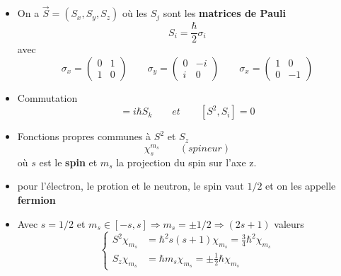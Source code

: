\begin{itemize}
	\item On a $\vec{S} = (S_x,S_y,S_z)$ où les $S_j$ sont les \textbf{matrices de Pauli} 
		\begin{equation}
			S_i = \frac{\hbar}{2}\sigma _i
		\end{equation}
		avec
		\begin{equation}
			\sigma _x = 
			\left(
			\begin{array}{cc}
			0 & 1 \\ 
			1 & 0
			\end{array}
			\right)
			\qquad
			\sigma _y = 
			\left(
			\begin{array}{cc}
			0 & -i \\ 
			i & 0
			\end{array}
			\right)
			\qquad
			\sigma _x = 
			\left(
			\begin{array}{cc}
			1 & 0 \\ 
			0 & -1
			\end{array}
			\right) 
		\end{equation}
	
	\item Commutation
		\begin{equation}
			[S_i,S_j] = i\hbar S_k \qquad et \qquad[S^2,S_i] = 0
		\end{equation}
		
	\item Fonctions propres communes à $S^2$ et $S_z$
		\begin{equation}
			\chi ^{m_s}_s \qquad (spineur)
		\end{equation}
	où $s$ est le \textbf{spin} et $m_s$ la projection du spin sur l'axe z. 
	
	\item pour l'électron, le protion et le neutron, le spin vaut $1/2$ et on les appelle \textbf{fermion}
	
	\item Avec $s = 1/2$ et $m_s \in [-s,s] \Rightarrow m_s = \pm 1/2 \Rightarrow(2s + 1)$ valeurs
		\begin{equation}
			\left\{
			\begin{aligned}
			S^2 \chi _{m_s} &= \hbar ^2 s(s+1) \chi _{m_s} = \frac{3}{4}\hbar ^2 \chi _{m_s}\\
			S_z \chi _{m_s} &= \hbar m_s \chi _{m_s} = \pm \frac{1}{2}\hbar \chi _{m_s} 
			\end{aligned}
			\right.
		\end{equation}
		

\end{itemize}
